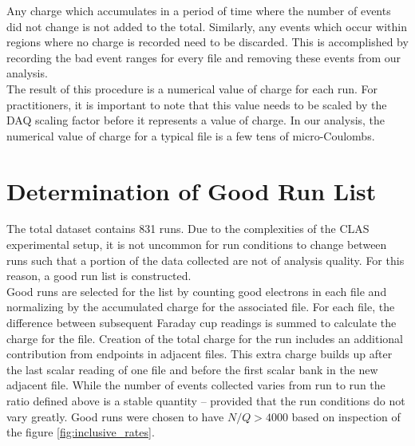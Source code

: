Any charge which accumulates in a period of time where the number of events did not change is not added to the total.  Similarly, any events which occur within regions where no charge is recorded need to be discarded.  This is accomplished by recording the bad event ranges for every file and removing these events from our analysis. \\

The result of this procedure is a numerical value of charge for each run.  For practitioners, it is important to note that this value needs to be scaled by the DAQ scaling factor before it represents a value of charge.  In our analysis, the numerical value of charge for a typical file is a few tens of micro-Coulombs.

\section{Determination of Good Run List}
The total dataset contains 831 runs.  Due to the complexities of the CLAS experimental setup, it is not uncommon for run conditions to change between runs such that a portion of the data collected are not of analysis quality.  For this reason, a good run list is constructed. \\

Good runs are selected for the list by counting good electrons in each file and normalizing by the accumulated charge for the associated file.  For each file, the difference between subsequent Faraday cup readings is summed to calculate the charge for the file.  Creation of the total charge for the run includes an additional contribution from endpoints in adjacent files.  This extra charge builds up after the last scalar reading of one file and before the first scalar bank in the new adjacent file.  While the number of events collected varies from run to run the ratio defined above is a stable quantity -- provided that the run conditions do not vary greatly.  Good runs were chosen to have $N/Q > 4000$ based on inspection of the figure \ref{fig:inclusive_rates}.  

